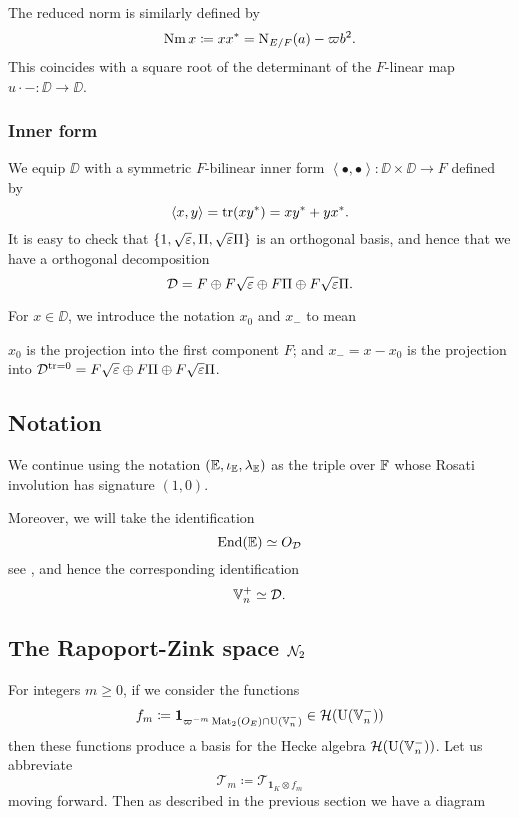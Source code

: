 The reduced norm is similarly defined by
\[ \operatorname{Nm} x \coloneqq x x^\ast = \operatorname{N}_{E/F}(a) - \varpi b^2. \]
This coincides with a square root of
the determinant of the $F$-linear map $u \cdot - \colon \DD \to \DD$.

\subsubsection{Inner form}
We equip $\DD$ with a symmetric $F$-bilinear inner form
$\left\langle \bullet, \bullet \right\rangle \colon \DD \times \DD \to F$ defined by
\[ \left\langle x,y \right\rangle = \operatorname{tr}(xy^\ast) = xy^\ast + yx^\ast. \]
It is easy to check that $\{1, \sqrt{\varepsilon}, \Pi, \sqrt{\varepsilon}\Pi\}$ is an orthogonal basis,
and hence that we have a orthogonal decomposition
\[ \mathcal D = F \oplus F\sqrt{\varepsilon} \oplus F \Pi \oplus F\sqrt{\varepsilon}\Pi. \]

For $x \in \DD$, we introduce the notation $x_0$ and $x_-$ to mean
\begin{itemize}
  \ii $x_0$ is the projection into the first component $F$; and
  \ii $x_- = x - x_0$ is the projection into
  $\mathcal D^{\operatorname{tr} = 0} = F\sqrt{\varepsilon} \oplus F \Pi \oplus F\sqrt{\varepsilon}\Pi$.
\end{itemize}

\subsection{Notation}
We continue using the notation $(\mathbb E, \iota_\mathbb E, \lambda_\mathbb E)$ as the triple over $\mathbb F$
whose Rosati involution has signature $(1,0)$.

Moreover, we will take the identification
\[ \operatorname{End}(\mathbb E) \simeq O_\mathcal D \]
see \cite[Remark 2.5]{ref:KR},
and hence the corresponding identification
\[ \mathbb V_n^+ \simeq \mathcal D. \]

\subsection{The Rapoport-Zink space $\mathcal N_2$}
For integers $m \ge 0$, if we consider the functions
\[ f_m \coloneqq \mathbf{1}_{\varpi^{-m} \operatorname{Mat}_2(O_E) \cap \operatorname{U}(\mathbb V_n^-)} \in \mathcal H(\operatorname{U}(\mathbb V_n^-)) \]
then these functions produce a basis for the Hecke algebra $\mathcal H(\operatorname{U}(\mathbb V_n^-))$.
Let us abbreviate
\[ \mathcal{T}_m \coloneqq \mathcal{T}_{\mathbf{1}_K \otimes f_m} \]
moving forward.
Then as described in the previous section we have a diagram
\begin{center}
\end{center}

